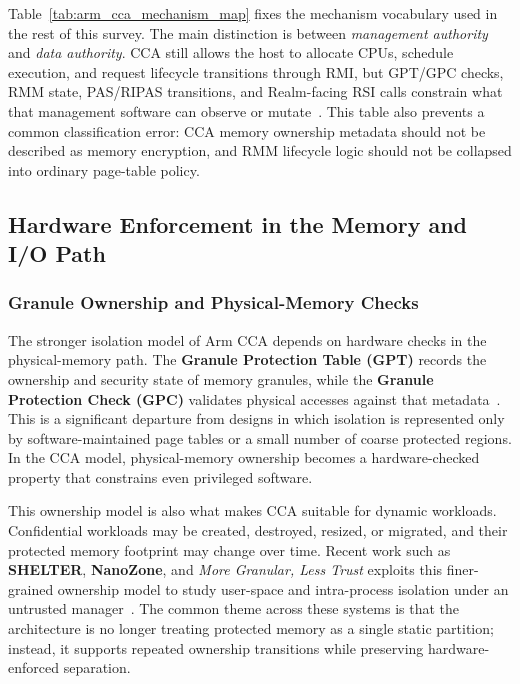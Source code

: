 Table~\ref{tab:arm_cca_mechanism_map} fixes the mechanism vocabulary used in the rest of this survey. The main distinction is between \emph{management authority} and \emph{data authority}. CCA still allows the host to allocate CPUs, schedule execution, and request lifecycle transitions through RMI, but GPT/GPC checks, RMM state, PAS/RIPAS transitions, and Realm-facing RSI calls constrain what that management software can observe or mutate~\cite{arm_cca_spec,arm_rme_spec,arm_rmm_spec,linux_arm_cca_doc}. This table also prevents a common classification error: CCA memory ownership metadata should not be described as memory encryption, and RMM lifecycle logic should not be collapsed into ordinary page-table policy.

\subsection{Hardware Enforcement in the Memory and I/O Path}

\subsubsection{Granule Ownership and Physical-Memory Checks}

The stronger isolation model of Arm CCA depends on hardware checks in the physical-memory path. The \textbf{Granule Protection Table (GPT)} records the ownership and security state of memory granules, while the \textbf{Granule Protection Check (GPC)} validates physical accesses against that metadata~\cite{arm_cca_spec,arm_rme_spec,linux_arm_cca_doc}. This is a significant departure from designs in which isolation is represented only by software-maintained page tables or a small number of coarse protected regions. In the CCA model, physical-memory ownership becomes a hardware-checked property that constrains even privileged software.

This ownership model is also what makes CCA suitable for dynamic workloads. Confidential workloads may be created, destroyed, resized, or migrated, and their protected memory footprint may change over time. Recent work such as \textbf{SHELTER}, \textbf{NanoZone}, and \textit{More Granular, Less Trust} exploits this finer-grained ownership model to study user-space and intra-process isolation under an untrusted manager~\cite{zhang2023shelter,liu2025nanozone,liu2025lesstrust}. The common theme across these systems is that the architecture is no longer treating protected memory as a single static partition; instead, it supports repeated ownership transitions while preserving hardware-enforced separation.

